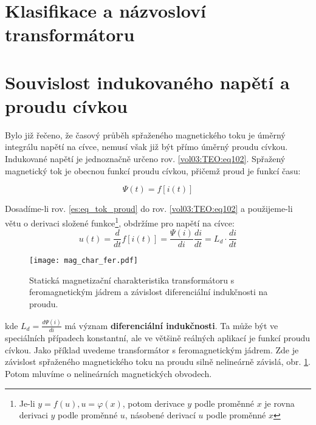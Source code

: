   \section{Klasifikace a názvosloví transformátoru}

  \section{Souvislost indukovaného napětí a proudu cívkou}
    Bylo již řečeno, že časový průběh spřaženého magnetického toku je úměrný integrálu napětí na 
    cívce, nemusí však již být přímo úměrný proudu cívkou. Indukované napětí je jednoznačně určeno 
    rov. \ref{vol03:TEO:eq102}. Spřažený magnetický tok je obecnou funkcí proudu cívkou, přičemž 
    proud je
    funkcí času:
    
    \begin{equation}\label{es:eq_tok_proud}
      \Psi(t) = f[i(t)]
    \end{equation}           

    Dosadíme-li rov. \ref{es:eq_tok_proud} do rov. \ref{vol03:TEO:eq102} a použijeme-li větu o 
    derivaci složené funkce\footnote{Je-li $y = f(u), u = \varphi(x)$, potom derivace \(y\) podle 
    proměnné \(x\) je rovna derivaci \(y\) podle proměnné $u$, násobené derivací $u$ podle proměnné 
    \(x\)}, obdržíme pro napětí na cívce:
    \begin{equation}\label{es_tok_deriv}
      u(t) = \frac{d}{dt} f[i(t)] = \frac{\Psi(i)}{di} \frac{di}{dt} = L_d \cdot \frac{di}{dt}
    \end{equation}

    \begin{figure}[ht!]  %
      \centering
      \texttt{[image: mag\_char\_fer.pdf]}
      \caption{Statická magnetizační charakteristika transformátoru s feromagnetickým jádrem a 
        závislost diferenciální indukčnosti na proudu. \cite[s.~5]{Elrev2005trafo}}
      \label{es:fig_mag_char_trafa_fer}
    \end{figure}
    
    kde $L_d=\frac{d\Psi(i)}{di}$ má význam \textbf{diferenciální indukčnosti}. Ta může být ve 
    speciálních případech konstantní, ale ve většině reálných aplikací je funkcí proudu cívkou. 
    Jako příklad uvedeme transformátor s feromagnetickým jádrem. Zde je závislost spřaženého 
    magnetického toku na proudu silně nelineárně závislá, obr. \ref{es:fig_mag_char_trafa_fer}. 
    Potom mluvíme o nelineárních magnetických obvodech.

